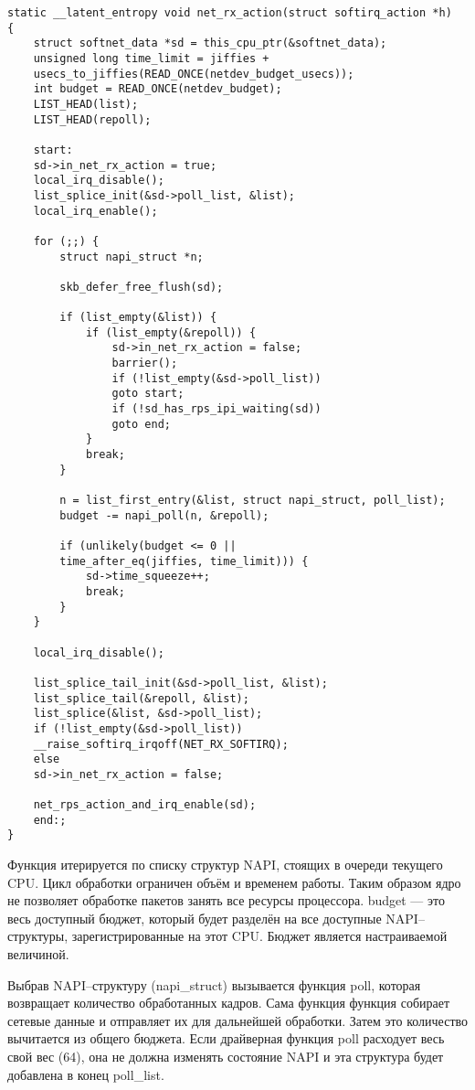 \begin{center}
	\captionsetup{justification=raggedright,singlelinecheck=off}
	\begin{lstlisting}[label=lst:net_rx_action,caption=Функция net\_rx\_action,showstringspaces=false]
static __latent_entropy void net_rx_action(struct softirq_action *h)
{
	struct softnet_data *sd = this_cpu_ptr(&softnet_data);
	unsigned long time_limit = jiffies +
	usecs_to_jiffies(READ_ONCE(netdev_budget_usecs));
	int budget = READ_ONCE(netdev_budget);
	LIST_HEAD(list);
	LIST_HEAD(repoll);
	
	start:
	sd->in_net_rx_action = true;
	local_irq_disable();
	list_splice_init(&sd->poll_list, &list);
	local_irq_enable();
	
	for (;;) {
		struct napi_struct *n;
		
		skb_defer_free_flush(sd);
		
		if (list_empty(&list)) {
			if (list_empty(&repoll)) {
				sd->in_net_rx_action = false;
				barrier();
				if (!list_empty(&sd->poll_list))
				goto start;
				if (!sd_has_rps_ipi_waiting(sd))
				goto end;
			}
			break;
		}
		
		n = list_first_entry(&list, struct napi_struct, poll_list);
		budget -= napi_poll(n, &repoll);
		
		if (unlikely(budget <= 0 ||
		time_after_eq(jiffies, time_limit))) {
			sd->time_squeeze++;
			break;
		}
	}
	
	local_irq_disable();
	
	list_splice_tail_init(&sd->poll_list, &list);
	list_splice_tail(&repoll, &list);
	list_splice(&list, &sd->poll_list);
	if (!list_empty(&sd->poll_list))
	__raise_softirq_irqoff(NET_RX_SOFTIRQ);
	else
	sd->in_net_rx_action = false;
	
	net_rps_action_and_irq_enable(sd);
	end:;
}
	\end{lstlisting}
\end{center}
\FloatBarrier

Функция итерируется по списку структур NAPI, стоящих в очереди текущего CPU. Цикл обработки ограничен объём и временем работы. Таким образом ядро не позволяет обработке пакетов занять все ресурсы процессора. budget — это весь доступный бюджет, который будет разделён на все доступные NAPI--структуры, зарегистрированные на этот CPU. Бюджет является настраиваемой величиной.

Выбрав NAPI--структуру (napi\_struct)  вызывается функция poll, которая возвращает количество обработанных кадров. Сама функция функция собирает сетевые данные и отправляет их для дальнейшей обработки. Затем это количество вычитается из общего бюджета. Если драйверная функция poll расходует весь свой вес (64), она не должна изменять состояние NAPI и эта структура будет добавлена в конец poll\_list.

